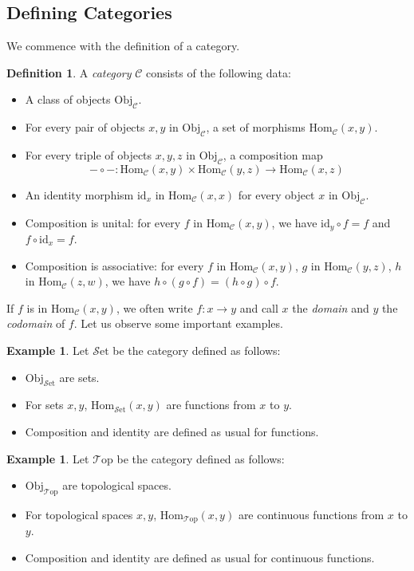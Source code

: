 \documentclass[11pt, a4paper]{amsart}
\newcommand{\cC}{\mathcal{C}}
\newcommand{\Hom}{\mathrm{Hom}}
\newcommand{\Set}{\mathscr{S}\mathrm{et}}
\newcommand{\Top}{\mathscr{T}\mathrm{op}}
\newcommand{\id}{\mathrm{id}}
\newcommand{\Obj}{\mathrm{Obj}}
\theoremstyle{definition}
\newtheorem{definition}[equation]{Definition}
\newtheorem{example}[equation]{Example}
\theoremstyle{remark}
\numberwithin{equation}{section}
\begin{document}
\subsection{Defining Categories}
We commence with the definition of a category. 
\begin{definition}
A \emph{category} $\cC$ consists of the following data:	
\begin{itemize}
    \item A class of objects $\Obj_{\cC}$.
    \item For every pair of objects $x,y$ in $\Obj_{\cC}$, a set of morphisms $\Hom_{\cC}(x,y)$.
    \item For every triple of objects $x,y,z$ in $\Obj_{\cC}$, a composition map
    \[
    - \circ - \colon \Hom_{\cC}(x,y) \times \Hom_{\cC}(y,z) \to \Hom_{\cC}(x,z)
    \]
    \item An identity morphism $\id_x$ in $\Hom_{\cC}(x,x)$ for every object $x$ in $\Obj_{\cC}$.
    \item Composition is unital: for every $f$ in $\Hom_{\cC}(x,y)$, we have $\id_y \circ f = f$ and $f \circ \id_x = f$.
		\item Composition is associative: for every $f$ in $\Hom_{\cC}(x,y)$, $g$ in $\Hom_{\cC}(y,z)$, $h$ in $\Hom_{\cC}(z,w)$, we have $h \circ (g \circ f) = (h \circ g) \circ f$.
\end{itemize}
\end{definition}

If $f$ is in $\Hom_{\cC}(x,y)$, we often write $f\colon x \to y$ and call $x$ the \emph{domain} and $y$ the \emph{codomain} of $f$. Let us observe some important examples. 

\begin{example} \label{ex:set}
  Let $\Set$ be the category defined as follows:
  \begin{itemize}
    \item $\Obj_{\Set}$ are sets.
    \item For sets $x,y$, $\Hom_{\Set}(x,y)$ are functions from $x$ to $y$.
    \item Composition and identity are defined as usual for functions.
  \end{itemize}
\end{example}

\begin{example} \label{ex:top}
  Let $\Top$ be the category defined as follows:
  \begin{itemize}
    \item $\Obj_{\Top}$ are topological spaces.
    \item For topological spaces $x,y$, $\Hom_{\Top}(x,y)$ are continuous functions from $x$ to $y$.
    \item Composition and identity are defined as usual for continuous functions.
  \end{itemize}
\end{example}
\end{document}
